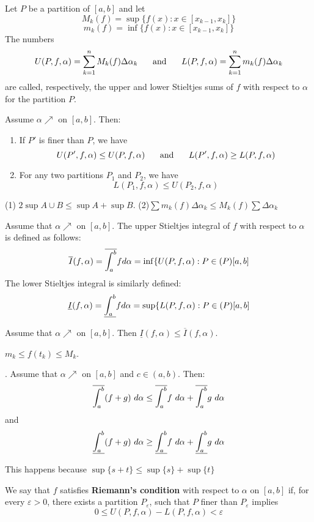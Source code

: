 \documentclass[10pt,a4paper]{book}
\begin{document}
\begin{deff}
 Let $P$ be a partition of $[a, b]$ and let
 $$M_k(f) = \sup\{f(x): x \in [x_{k-1}, x_k]\}$$
 $$m_k(f) = \inf\{f(x): x \in [x_{k-1}, x_k]\}$$
The numbers 
$$U(P, f, \alpha) = \sum_{k=1}^n M_k(f)\Delta \alpha_k \hspace*{0.5cm} \text{ and } \hspace*{0.5cm}
L(P, f, \alpha) = \sum_{k=1}^n m_k(f)\Delta \alpha_k$$
are called, respectively, the upper and lower Stieltjes sums of $f$ with respect to $\alpha$ for the partition $P$.


 \end{deff}
 \newcommand{\ai}{\alpha \nearrow}
\begin{Thm}
Assume $\ai$  on $[a,b]$. Then:
\begin{enumerate}
    \item If $P'$ is finer than $P$, we have
    $$U(P',f, \alpha) \leq U(P,f, \alpha)\hspace*{0.5cm} \text{ and } \hspace*{0.5cm} L(P',f, \alpha) \geq L(P,f, \alpha)$$
    \item For any two partitions $P_1$ and $P_2$, we have
        $$ L(P_1,f, \alpha) \leq  U(P_2,f, \alpha)$$
\end{enumerate}
\end{Thm}
\PP (1) $2\sup A\cup B \leq \sup A + \sup B.$ (2)$\sum m_k(f)\Delta \alpha_k \leq M_k(f) \sum\Delta \alpha_k$

\begin{deff}
Assume that $\ai$ on $[a, b]$. The upper Stieltjes integral of $f$ with respect to $\alpha$ is defined as follows:
$$\overline{I}(f,\alpha) = \overline{\int_a^b} f d \alpha =  \inf\{U(P,f,\alpha): P\in \mathcal(P)[a,b]$$
The lower Stieltjes integral is similarly defined:
$$\underline{I}(f,\alpha) = \underline{\int_a^b} f d \alpha =  \sup\{L(P,f,\alpha): P\in \mathcal(P)[a,b]$$
\end{deff}

\begin{Thm}
 Assume that $\ai$ on $[a, b]$. Then $\underline{I}(f,\alpha) \leq \overline{I}(f,\alpha)$.
\end{Thm}
\PP $m_k \leq f(t_k) \leq M_k$.

\begin{Thm} . Assume that $\ai$ on $[a, b]$ and $c \in (a,b)$. Then:
$$\overline{\int_a^b} (f+g)\ d \alpha \leq \overline{\int_a^b} f \ d \alpha + \overline{\int_a^b} g \ d \alpha$$
and
$$\underline{\int_a^b} (f+g)\ d \alpha \geq \underline{\int_a^b} f \ d \alpha + \underline{\int_a^b} g \ d \alpha$$
\end{Thm}
\PP This happens because $\sup\{s + t\} \leq \sup\{s\} + \sup\{t\}$
\begin{deff}
We say that $f$ satisfies \textbf{Riemann's condition} with respect to $\alpha$ on
$[a, b]$ if, for every $\varepsilon > 0$, there exists a partition $P_\varepsilon$, such that $P$ finer than $P_\varepsilon$ implies
$$0 \leq U(P,f,\alpha)-L(P,f,\alpha) < \varepsilon$$
\end{deff}
\end{document}
